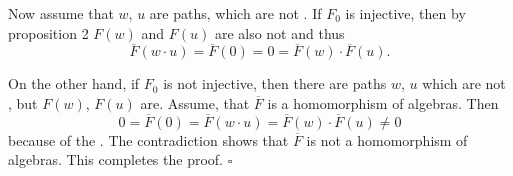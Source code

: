 \documentclass[12pt]{article}
\begin{document}
Now assume that $w$, $u$ are paths, which are not . If $F_0$ is injective, then by proposition 2 $F(w)$ and $F(u)$ are also not  and thus
$$\overline{F}(w\cdot u)=\overline{F}(0)=0=\overline{F}(w)\cdot \overline{F}(u).$$

On the other hand, if $F_0$ is not injective, then there are paths $w$, $u$ which are not , but $F(w)$, $F(u)$ are. Assume, that $\overline{F}$ is a homomorphism of algebras. Then
$$0=\overline{F}(0)=\overline{F}(w\cdot u)=\overline{F}(w)\cdot \overline{F}(u)\neq 0$$
because of the . The contradiction shows that $\overline{F}$ is not a homomorphism of algebras. This completes the proof. $\square$
\end{document}
